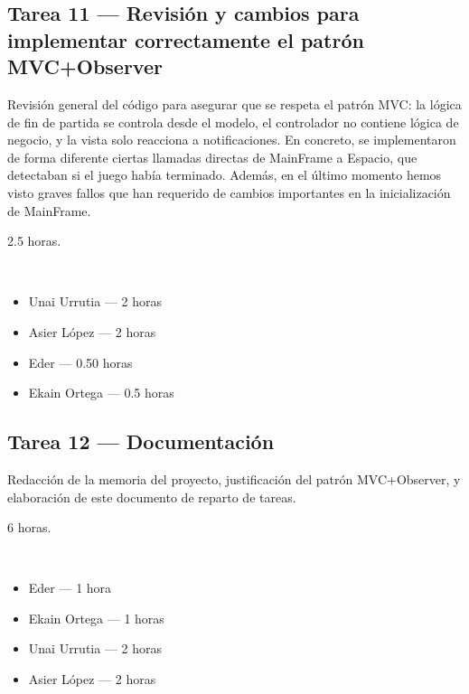 \documentclass[12pt, a4paper]{article}
\begin{document}
\vspace{0.8em}

\subsection*{Tarea 11 — Revisión y cambios para implementar correctamente el patrón MVC+Observer}
\begin{description}[leftmargin=2em, style=nextline]
    \item[\textbf{Descripción:}] Revisión general del código para asegurar que se respeta el patrón MVC: la lógica de fin de partida se controla desde el modelo, el controlador no contiene lógica de negocio, y la vista solo reacciona a notificaciones. En concreto, se implementaron de forma diferente ciertas llamadas directas de MainFrame a Espacio, que detectaban si el juego había terminado. 
    Además, en el último momento hemos visto graves fallos que han requerido de cambios importantes en la inicialización de MainFrame.
    \item[\textbf{Tiempo:}] 2.5 horas.
    \item[\textbf{Responsables y dedicación:}]~
        \begin{itemize}[leftmargin=1em, nosep]
            \item Unai Urrutia — 2 horas
            \item Asier López — 2 horas
            \item Eder — 0.50 horas
            \item Ekain Ortega — 0.5 horas
        \end{itemize}
\end{description}

\vspace{0.8em}

\subsection*{Tarea 12 — Documentación}
\begin{description}[leftmargin=2em, style=nextline]
    \item[\textbf{Descripción:}] Redacción de la memoria del proyecto, justificación del patrón MVC+Observer, y elaboración de este documento de reparto de tareas.
    \item[\textbf{Tiempo:}] 6 horas.
    \item[\textbf{Responsables y dedicación:}]~
        \begin{itemize}[leftmargin=1em, nosep]
            \item Eder — 1 hora
            \item Ekain Ortega — 1 horas
            \item Unai Urrutia — 2 horas
            \item Asier López — 2 horas
        \end{itemize}
\end{description}
\end{document}
